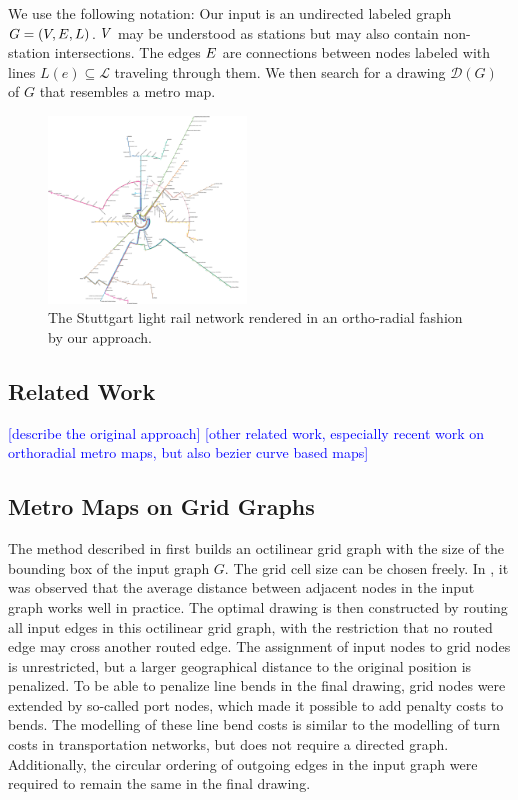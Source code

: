 \documentclass[sigconf]{acmart}
\newcommand\TODO[1]{\textcolor{blue}{\small [#1]}}
\begin{document}
We use the following notation:
Our input is an undirected labeled graph $G = (V, E, L)$.
$V$ may be understood as stations but may also contain non-station intersections.
The edges $E$ are connections between nodes labeled with lines $L(e) \subseteq \mathcal{L}$ traveling through them.
We then search for a drawing $\mathcal{D}(G)$ of $G$ that resembles a metro map.

\begin{figure}
    \centering
	\vspace{-0.6cm}
	\includegraphics[width=0.47\textwidth]{figures2/stuttgart-ortho.pdf}
	\caption{The Stuttgart light rail network rendered in an ortho-radial fashion by our approach.}
	\label{FIG:stuttgart}
\end{figure}

\subsection{Related Work}
\label{SEC:related}

\TODO{describe the original approach}
\TODO{other related work, especially recent work on orthoradial metro maps, but also bezier curve based maps}

\subsection{Metro Maps on Grid Graphs}

The method described in \cite{TODO} first builds an octilinear grid graph with the size of the bounding box of the input graph $G$.
The grid cell size can be chosen freely.
In \cite{TODO}, it was observed that the average distance between adjacent nodes in the input graph works well in practice.
The optimal drawing is then constructed by routing all input edges in this octilinear grid graph, with the restriction that no routed edge may cross another routed edge.
The assignment of input nodes to grid nodes is unrestricted, but a larger geographical distance to the original position is penalized.
To be able to penalize line bends in the final drawing, grid nodes were extended by so-called port nodes, which made it possible to add penalty costs to bends.
The modelling of these line bend costs is similar to the modelling of turn costs in transportation networks, but does not require a directed graph.
Additionally, the circular ordering of outgoing edges in the input graph were required to remain the same in the final drawing.
\end{document}
